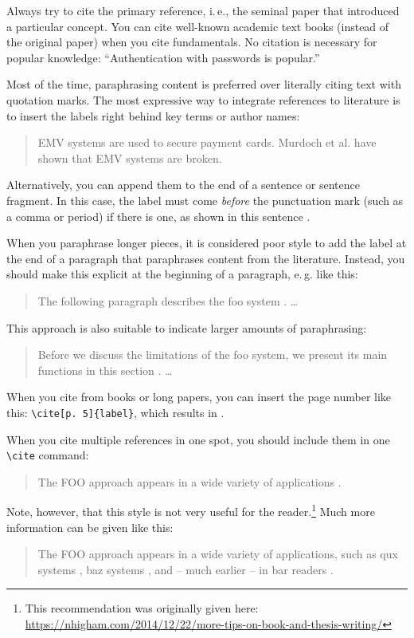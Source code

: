 Always try to cite the primary reference, i.\,e., the seminal paper that introduced a particular concept. You can cite well-known academic text books (instead of the original paper) when you cite fundamentals. No citation is necessary for popular knowledge: ``Authentication with passwords is popular.''

Most of the time, paraphrasing content is preferred over literally citing text with quotation marks. The most expressive way to integrate references to literature is to insert the labels right behind key terms or author names:
\begin{quote}
  EMV systems \cite{anderson_ross_emv:_2014} are used to secure payment cards. Murdoch et al. \cite{murdoch_steven_j._chip_2010} have shown that EMV systems are broken.
\end{quote}

Alternatively, you can append them to the end of a sentence or sentence fragment. In this case, the label must come \emph{before} the punctuation mark (such as a comma or period) if there is one, as shown in this sentence \cite{Hintz02}.

When you paraphrase longer pieces, it is considered poor style to add the label at the end of a paragraph that paraphrases content from the literature. Instead, you should make this explicit at the beginning of a paragraph, e.\,g. like this:
\begin{quote}
  The following paragraph describes the foo system \cite{kou_weidong_secure_2003}. …
\end{quote}

This approach is also suitable to indicate larger amounts of paraphrasing:
\begin{quote}
  Before we discuss the limitations of the foo system, we present its main functions in this section \cite{kou_weidong_secure_2003}. …
\end{quote}

When you cite from books or long papers, you can insert the page number like this: \verb|\cite[p. 5]{label}|, which results in \cite[p. 5]{kou_weidong_secure_2003}.

When you cite multiple references in one spot, you should include them in one \verb|\cite| command:
\begin{quote}
  The FOO approach appears in a wide variety of applications \cite{murdoch_steven_j._chip_2010,anderson_ross_emv:_2014,kou_weidong_secure_2003}.
\end{quote}

Note, however, that this style is not very useful for the reader.\footnote{This recommendation was originally given here: \url{https://nhigham.com/2014/12/22/more-tips-on-book-and-thesis-writing/}} Much more information can be given like this:
\begin{quote}
The FOO approach appears in a wide variety of applications, such as qux systems \cite{murdoch_steven_j._chip_2010}, baz systems \cite{anderson_ross_emv:_2014}, and -- much earlier -- in bar readers \cite{kou_weidong_secure_2003}.
\end{quote}

